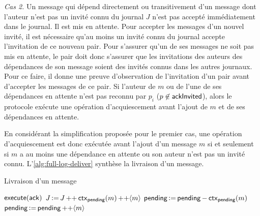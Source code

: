 
\emph{Cas 2.} Un message qui dépend directement ou transitivement d'un message dont l'auteur n'est pas un invité connu du journal $J$ n'est pas accepté immédiatement dans le journal.
Il est mis en attente.
Pour accepter les messages d'un nouvel invité, il est nécessaire qu'au moins un invité connu du journal accepte l'invitation de ce nouveau pair.
Pour s'assurer qu'un de ses messages ne soit pas mis en attente, le pair doit donc s'assurer que les invitations des auteurs des dépendances de son message soient des invités connus dans les autres journaux.
Pour ce faire, il donne une preuve d'observation de l'invitation d'un pair avant d'accepter les messages de ce pair.
Si l'auteur de $m$ ou de l'une de ses dépendances en attente n'est pas reconnu par $p_i$ ($p \not\in \operatorname{\mathsf{ackInvited}}$), alors le protocole exécute une opération d'acquiescement avant l'ajout de $m$ et de ses dépendances en attente.

En considérant la simplification proposée pour le premier cas, une opération d'acquiescement est donc exécutée avant l'ajout d'un message $m$ si et seulement si $m$ a au moins une dépendance en attente ou son auteur n'est pas un invité connu.
L'\autoref{alg:full-log-deliver} synthèse la livraison d'un message.

\begin{algorithm}[ht]
\caption{Livraison d'un message}\label{alg:full-log-deliver}
\begin{algorithmic}[1]
                \State $\operatorname{\mathsf{execute}}(\operatorname{\mathsf{ack}})$
            \EndIf
            \State $J \assign J \lappend \trm{ctx}_{\trm{pending}}(m) \lappend \tuple*{m}$
            \State $\operatorname{\mathsf{pending}} \operatorname{\vcentcolon=} \operatorname{\mathsf{pending}} - \operatorname{\mathsf{ctx}}_{\operatorname{\mathsf{pending}}}(m)$
        \Else
            \State $\trm{pending} \assign \trm{pending} \lappend \tuple*{m}$
        \EndIf
    \EndIf
\EndProcedure
\end{algorithmic}
\end{algorithm}


